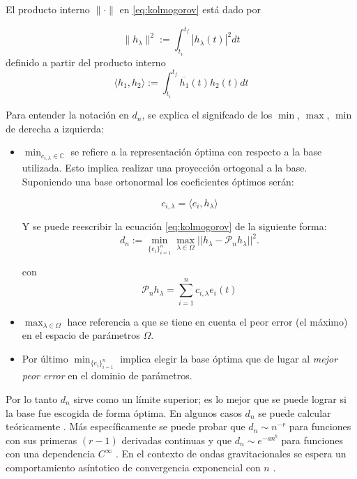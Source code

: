 El producto interno $\|\cdot\|$ en \eqref{eq:kolmogorov} está dado por

\[
\|h_{\lambda}\|^2 :=\int_{t_i}^{t_f}|h_{\lambda}(t)|^2dt
\]
definido a partir del producto interno
\[
\langle h_1, h_2 \rangle  :=\int_{t_i}^{t_f} \overline{h_{1}}(t) h_2 (t)dt
\]

Para entender la notación en $d_n$, se explica el signifcado de los $\min$, $\max$, $\min$ de derecha a izquierda:

\begin{itemize}
\item $\min_{ c_{i,\lambda} \in \mathbb{C}}$ se refiere a la representación óptima con respecto a la base utilizada. Esto implica realizar una proyección ortogonal a la base. Suponiendo una base ortonormal los coeficientes óptimos serán:

\begin{equation} \label{eq:coefs}
c_{i, \lambda} = \langle e_i, h_{\lambda} \rangle 
\end{equation}

Y se puede reescribir la ecuación \eqref{eq:kolmogorov} de la siguiente forma:
\[
d_n := \min_{\{e_i\}_{i=1}^n} \max_{\lambda \in \Omega} || h_{\lambda} - \mathcal{P}_nh_{\lambda} ||^2.
\]

con 
\begin{equation}
\mathcal{P}_nh_{\lambda} = \sum_{i=1}^{n} c_{i,\lambda} e_i(t)
\end{equation}

\item $\max_{\lambda \in \Omega}$ hace referencia a que se tiene en cuenta el peor error (el máximo) en el espacio de parámetros $\Omega$. 
\item Por último $\min_{\{e_i\}_{i=1}^n}$ implica elegir la base óptima que de lugar al \textit{mejor peor error} en el dominio de parámetros.
\end{itemize}

Por lo tanto $d_n$ sirve como un límite superior; es lo mejor que se puede lograr si la base fue escogida de forma óptima.
En algunos casos $d_n$ se puede calcular teóricamente \cite{MAGARILILYAEV200197}. Más específicamente se puede probar que $d_n \sim n^{-r}$ para funciones con sus primeras $(r-1)$ derivadas continuas y que $d_n \sim e^{-an^b}$ para funciones con una dependencia $C^{\infty}$  \cite{articleg}. En el contexto de ondas gravitacionales se espera un comportamiento asíntotico de convergencia exponencial con $n$ \citep{PhysRevX.4.031006, Herrmann:2012xpx}.

